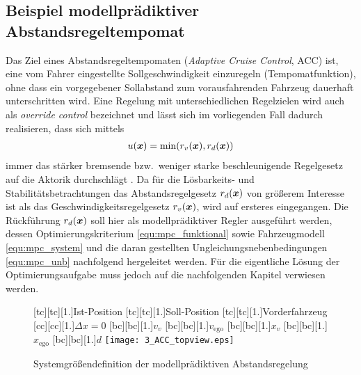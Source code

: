 \subsection{Beispiel modellprädiktiver Abstandsregeltempomat} \label{sec:mpc_acc}
Das Ziel eines Abstandsregeltempomaten (\emph{Adaptive Cruise Control}, ACC) ist, eine vom Fahrer eingestellte Sollgeschwindigkeit einzuregeln (Tempomatfunktion), ohne dass ein vorgegebener Sollabstand zum vorausfahrenden Fahrzeug dauerhaft unterschritten wird. Eine Regelung mit unterschiedlichen Regelzielen wird auch als \emph{override control} bezeichnet \cite{glattfelder1983soc} und lässt sich im vorliegenden Fall dadurch realisieren, dass sich mittels
\begin{align*}
	u(\boldsymbol{x}) = \min(r_v(\boldsymbol{x}), r_d(\boldsymbol{x}))
\end{align*}
immer das stärker bremsende bzw.\ weniger starke beschleunigende Regelgesetz auf die Aktorik durchschlägt \cite{atSonderheft08, handbuchFAS_Winner}. Da für die Lösbarkeits- und Stabilitätsbetrachtungen das Abstandsregelgesetz $r_d(\boldsymbol{x})$ von größerem Interesse ist als das Geschwindigkeitsregelgesetz $r_v(\boldsymbol{x})$, wird auf ersteres eingegangen. Die Rückführung $r_d(\boldsymbol{x})$ soll hier als modellprädiktiver Regler ausgeführt werden, dessen Optimierungskriterium \eqref{equ:mpc_funktional} sowie Fahrzeugmodell \eqref{equ:mpc_system} und die daran gestellten Ungleichungsnebenbedingungen \eqref{equ:mpc_unb} nachfolgend hergeleitet werden. Für die eigentliche Lösung der Optimierungsaufgabe muss jedoch auf die nachfolgenden Kapitel verwiesen werden.

\begin{figure}[h]
\centering
    [tc][tc][1.]{Ist-Position}
		[tc][tc][1.]{Soll-Position}
		[tc][tc][1.]{Vorderfahrzeug}
		[cc][cc][1.]{$\Delta x = 0$}
    [bc][bc][1.]{$v_v$}
		[bc][bc][1.]{$v_\text{ego}$}
		[bc][bc][1.]{$x_v$}
		[bc][bc][1.]{$x_\text{ego}$}
		[bc][bc][1.]{$d$}
	\texttt{[image: 3\_ACC\_topview.eps]}
	\caption{Systemgrößendefinition der modellprädiktiven Abstandsregelung}
	\label{fig:ACC_topview}
\end{figure}

